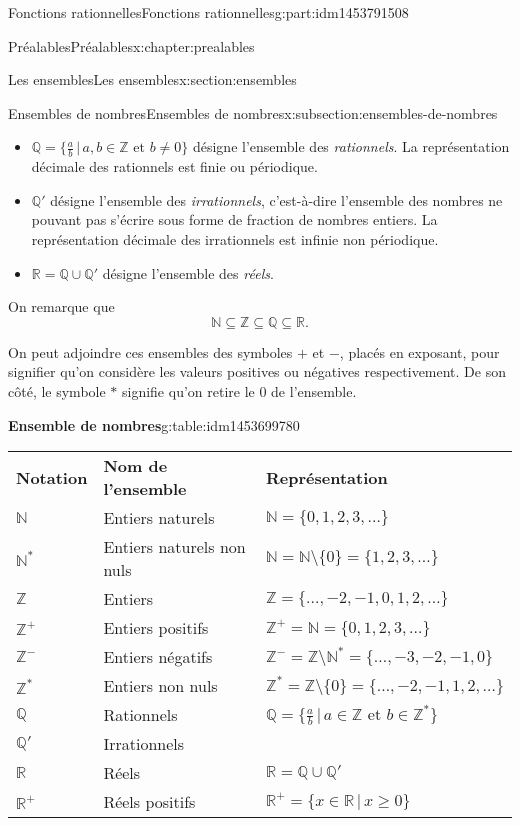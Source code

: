 \documentclass[oneside,10pt,]{book}
\newcommand{\tabularfont}{\relax}
\newcommand{\hrulethin}  {\noalign{\hrule height 0.04em}}
\newcommand{\telque}{ \,|\, }
\begin{document}
\begin{partptx}{Fonctions rationnelles}{}{Fonctions rationnelles}{}{}{g:part:idm1453791508}
\begin{chapterptx}{Préalables}{}{Préalables}{}{}{x:chapter:prealables}
\begin{sectionptx}{Les ensembles}{}{Les ensembles}{}{}{x:section:ensembles}
\begin{subsectionptx}{Ensembles de nombres}{}{Ensembles de nombres}{}{}{x:subsection:ensembles-de-nombres}
\begin{itemize}[label=\textbullet]
\item{}\(\mathbb{Q} = \{\frac{a}{b} \telque a, b \in \mathbb{Z} \text{ et } b \neq 0\}\) désigne l'ensemble des \emph{rationnels}. La représentation décimale des rationnels est finie ou périodique.%
\item{}\(\mathbb{Q}'\) désigne l'ensemble des \emph{irrationnels}, c'est-à-dire l'ensemble des nombres ne pouvant pas s'écrire sous forme de fraction de nombres entiers. La représentation décimale des irrationnels est infinie non périodique.%
\item{}\(\mathbb{R} = \mathbb{Q} \cup \mathbb{Q}'\) désigne l'ensemble des \emph{réels}.%
\end{itemize}
%
\par
On remarque que%
\begin{equation*}
\mathbb{N} \subseteq \mathbb{Z} \subseteq \mathbb{Q} \subseteq \mathbb{R}.
\end{equation*}
%
\par
On peut adjoindre ces ensembles des symboles \(+\) et \(-\), placés en exposant, pour signifier qu’on considère les valeurs positives ou négatives respectivement. De son côté, le symbole \(*\) signifie qu’on retire le 0 de l'ensemble.%
\par
\begin{tableptx}{\textbf{Ensemble de nombres}}{g:table:idm1453699780}{}%
\centering%
{\tabularfont%
\begin{tabular}{lll}
\textbf{Notation}&\textbf{Nom de l'ensemble}&\textbf{Représentation}\tabularnewline\hrulethin
\(\mathbb{N}\)&Entiers naturels&\(\mathbb{N} = \{0,1,2,3,\ldots\}\)\tabularnewline[0pt]
\(\mathbb{N}^{*}\)&Entiers naturels non nuls&\(\mathbb{N} = \mathbb{N} \setminus \{0\} = \{1,2,3,\ldots\}\)\tabularnewline[0pt]
\(\mathbb{Z}\)&Entiers&\(\mathbb{Z} = \{\ldots,-2,-1,0,1,2,\ldots\}\)\tabularnewline[0pt]
\(\mathbb{Z}^{+}\)&Entiers positifs&\(\mathbb{Z}^{+} = \mathbb{N} = \{0,1,2,3,\ldots\}\)\tabularnewline[0pt]
\(\mathbb{Z}^{-}\)&Entiers négatifs&\(\mathbb{Z}^{-} = \mathbb{Z} \setminus \mathbb{N}^{*} = \{\ldots,-3,-2,-1,0\}\)\tabularnewline[0pt]
\(\mathbb{Z}^{*}\)&Entiers non nuls&\(\mathbb{Z}^{*} = \mathbb{Z} \setminus \{0\} = \{\ldots,-2,-1,1,2,\ldots\}\)\tabularnewline[0pt]
\(\mathbb{Q}\)&Rationnels&\(\mathbb{Q} = \{\frac{a}{b} \telque a \in \mathbb{Z} \text{ et } b \in \mathbb{Z}^{*}\}\)\tabularnewline[0pt]
\(\mathbb{Q}'\)&Irrationnels&\tabularnewline[0pt]
\(\mathbb{R}\)&Réels&\(\mathbb{R} = \mathbb{Q} \cup \mathbb{Q}'\)\tabularnewline[0pt]
\(\mathbb{R}^{+}\)&Réels positifs&\(\mathbb{R}^{+} = \{x \in \mathbb{R} \telque x \geqslant 0\}\)\tabularnewline[0pt]

\end{tabular}}
\end{tableptx}
\end{subsectionptx}
\end{sectionptx}
\end{chapterptx}
\end{partptx}
\end{document}
